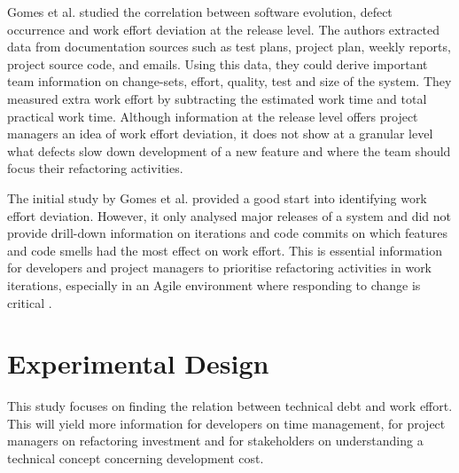 Gomes et al. \cite{Gomes2011} studied the correlation between software
evolution, defect occurrence and work effort deviation at the release level. The
authors extracted data from documentation sources such as test plans, project
plan, weekly reports, project source code, and emails. Using this data, they
could derive important team information on change-sets, effort, quality, test
and size of the system. They measured extra work effort by subtracting the
estimated work time and total practical work time. Although information at the
release level offers project managers an idea of work effort deviation, it does
not show at a granular level what defects slow down development of a new feature
and where the team should focus their refactoring activities.

The initial study by Gomes et al. \cite{Gomes2011} provided a good start into
identifying work effort deviation. However, it only analysed major releases of a
system and did not provide drill-down information on iterations and code commits
on which features and code smells had the most effect on work effort. This is
essential information for developers and project managers to prioritise
refactoring activities in work iterations, especially in an Agile environment
where responding to change is critical \cite{agile-manifesto}.

\section{Experimental Design}
\label{work-plan}

This study focuses on finding the relation between technical debt and work
effort. This will yield more information for developers on time management, for
project managers on refactoring investment and for stakeholders on understanding
a technical concept concerning development cost.


